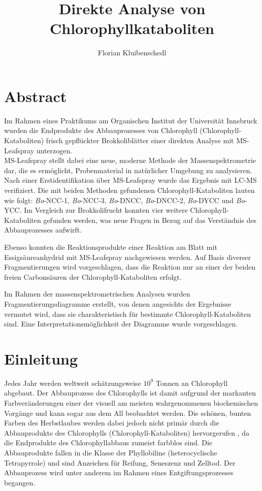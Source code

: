 \documentclass[12pt,a4paper]{article}
\author{Florian Kluibenschedl}
\title{Direkte Analyse von Chlorophyllkataboliten}
\begin{document}
\maketitle

\section{Abstract}
  Im Rahmen eines Praktikums am Organischen Institut der Universität Innsbruck wurden die Endprodukte des Abbauprozesses von Chlorophyll (Chlorophyll-Kataboliten) frisch gepflückter Brokkoliblätter einer direkten Analyse mit MS-Leafspray unterzogen.\\

MS-Leafspray stellt dabei eine neue, moderne Methode der Massenspektrometrie dar, die es ermöglicht, Probenmaterial in natürlicher Umgebung zu analysieren. Nach einer Erstidentifikation über MS-Leafspray wurde das Ergebnis mit LC-MS verifiziert. Die mit beiden Methoden gefundenen Chlorophyll-Kataboliten lauten wie folgt: \textit{Bo}-NCC-1, \textit{Bo}-NCC-3, \textit{Bo}-DNCC, \textit{Bo}-DNCC-2, \textit{Bo}-DYCC und \textit{Bo}-YCC. Im Vergleich zur Brokkolifrucht konnten vier weitere Chlorophyll-Kataboliten gefunden werden, was neue Fragen in Bezug auf das Verständnis des Abbauprozesses aufwirft. 

Ebenso konnten die Reaktionsprodukte einer Reaktion am Blatt mit Essigsäureanhydrid mit MS-Leafspray nachgewiesen werden. Auf Basis diverser Fragmentierungen wird vorgeschlagen, dass die Reaktion nur an einer der beiden freien Carbonsäuren der Chlorophyll-Kataboliten erfolgt. 

Im Rahmen der massenspektrometrischen Analysen wurden Fragmentierungsdiagramme erstellt, von denen angesichts der Ergebnisse vermutet wird, dass sie charakteristisch für bestimmte Chlorophyll-Kataboliten sind. Eine Interpretationsmöglichkeit der Diagramme wurde vorgeschlagen.

\section{Einleitung}

Jedes Jahr werden weltweit schätzungsweise $10^{9}$ Tonnen an Chlorophyll abgebaut. Der Abbauprozess des Chlorophylls ist damit aufgrund der markanten Farbveränderungen einer der visuell am meisten wahrgenommenen biochemischen Vorgänge und kann sogar aus dem All beobachtet werden. \cite{ChlorophyllBreakdown} Die schönen, bunten Farben des Herbstlaubes werden dabei jedoch nicht primär durch die Abbauprodukte des Chlorophylls (Chlorophyll-Kataboliten) hervorgerufen  \cite{DegradationChlorophyll}, da die Endprodukte des Chlorophyllabbaus zumeist farbblos sind. \cite{ChlorophyllBreakdown} Die Abbauprodukte fallen in die Klasse der Phyllobiline (heterocyclische Tetrapyrrole) und sind Anzeichen für Reifung, Seneszenz und Zelltod. Der Abbauprozess wird unter anderem im Rahmen eines Entgiftungsprozesses begangen. \cite{ChlorophyllKatabolitenalsZeichenReifung}
\end{document}
